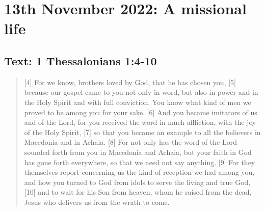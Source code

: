 \section{13th November 2022: A missional life}
\subsection*{Text: 1 Thessalonians 1:4-10}
  \begin{quote}
    [4] For we know, brothers loved by God, that he has chosen you, [5]
    because our gospel came to you not only in word, but also in power and in
    the Holy Spirit and with full conviction.  You know what kind of men we
    proved to be among you for your sake.  [6] And you became imitators of us
    and of the Lord, for you received the word in much affliction, with the
    joy of the Holy Spirit, [7] so that you became an example to all the
    believers in Macedonia and in Achaia.  [8] For not only has the word of
    the Lord sounded forth from you in Macedonia and Achaia, but your faith
    in God has gone forth everywhere, so that we need not say anything.  [9]
    For they themselves report concerning us the kind of reception we had
    among you, and how you turned to God from idols to serve the living and
    true God, [10] and to wait for his Son from heaven, whom he raised from
    the dead, Jesus who delivers us from the wrath to come.
  \end{quote}
